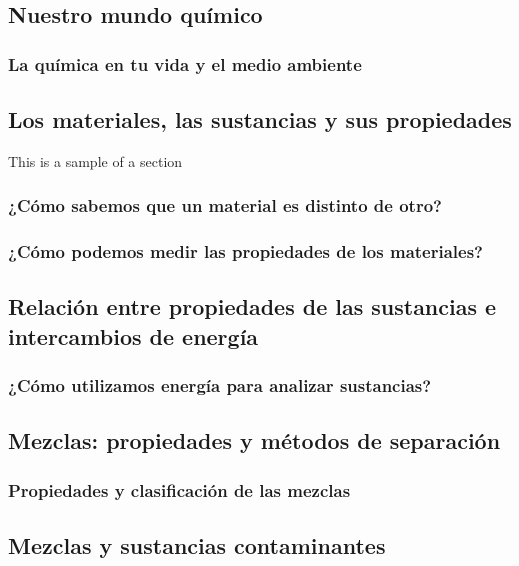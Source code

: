 \documentclass[11pt]{book}
\begin{document}

\restoregeometry
{}
\tableofcontents
\chapter{}
\newpage
\section{Nuestro mundo químico}
\subsection{La química en tu vida y el medio ambiente }

\newpage
\section{Los materiales, las sustancias y sus propiedades}
This is a sample of a section
\subsection{¿Cómo sabemos que un material es distinto de otro?}
\subsection{¿Cómo podemos medir las propiedades de los materiales?}
\newpage
\section{Relación entre propiedades de las sustancias e intercambios de energía}
\subsection{¿Cómo utilizamos energía para analizar sustancias?}

\newpage
\section{Mezclas: propiedades y métodos de separación}

\subsection{Propiedades y clasificación de las mezclas}

\newpage
\section{Mezclas y sustancias contaminantes}
\end{document}

